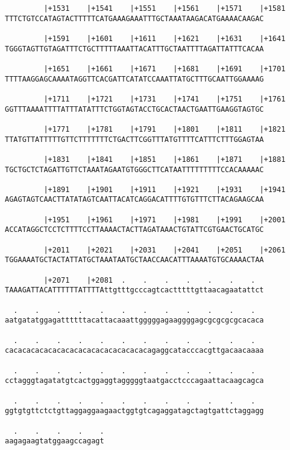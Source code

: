 \documentclass{article}
\begin{document}
\begin{Verbatim}
         |+1531    |+1541    |+1551    |+1561    |+1571    |+1581
TTTCTGTCCATAGTACTTTTTCATGAAAGAAATTTGCTAAATAAGACATGAAAACAAGAC
                                                            
         |+1591    |+1601    |+1611    |+1621    |+1631    |+1641
TGGGTAGTTGTAGATTTCTGCTTTTTAAATTACATTTGCTAATTTTAGATTATTTCACAA
                                                            
         |+1651    |+1661    |+1671    |+1681    |+1691    |+1701
TTTTAAGGAGCAAAATAGGTTCACGATTCATATCCAAATTATGCTTTGCAATTGGAAAAG
                                                            
         |+1711    |+1721    |+1731    |+1741    |+1751    |+1761
GGTTTAAAATTTTATTTATATTTCTGGTAGTACCTGCACTAACTGAATTGAAGGTAGTGC
                                                            
         |+1771    |+1781    |+1791    |+1801    |+1811    |+1821
TTATGTTATTTTTGTTCTTTTTTTCTGACTTCGGTTTATGTTTTCATTTCTTTGGAGTAA
                                                            
         |+1831    |+1841    |+1851    |+1861    |+1871    |+1881
TGCTGCTCTAGATTGTTCTAAATAGAATGTGGGCTTCATAATTTTTTTTTCCACAAAAAC
                                                            
         |+1891    |+1901    |+1911    |+1921    |+1931    |+1941
AGAGTAGTCAACTTATATAGTCAATTACATCAGGACATTTTGTGTTTCTTACAGAAGCAA
                                                            
         |+1951    |+1961    |+1971    |+1981    |+1991    |+2001
ACCATAGGCTCCTCTTTTCCTTAAAACTACTTAGATAAACTGTATTCGTGAACTGCATGC
                                                            
         |+2011    |+2021    |+2031    |+2041    |+2051    |+2061
TGGAAAATGCTACTATTATGCTAAATAATGCTAACCAACATTTAAAATGTGCAAAACTAA
                                                            
         |+2071    |+2081  .    .    .    .    .    .    .  
TAAAGATTACATTTTTTATTTTAttgtttgcccagtcactttttgttaacagaatattct
                                                            
  .    .    .    .    .    .    .    .    .    .    .    .  
aatgatatggagattttttacattacaaattgggggagaaggggagcgcgcgcgcacaca
                                                            
  .    .    .    .    .    .    .    .    .    .    .    .  
cacacacacacacacacacacacacacacacacagaggcatacccacgttgacaacaaaa
                                                            
  .    .    .    .    .    .    .    .    .    .    .    .  
cctagggtagatatgtcactggaggtagggggtaatgacctcccagaattacaagcagca
                                                            
  .    .    .    .    .    .    .    .    .    .    .    .  
ggtgtgttctctgttaggaggaagaactggtgtcagaggatagctagtgattctaggagg
                                                            
  .    .    .    .    .
aagagaagtatggaagccagagt
                       
                       
\end{Verbatim}
\end{document}
